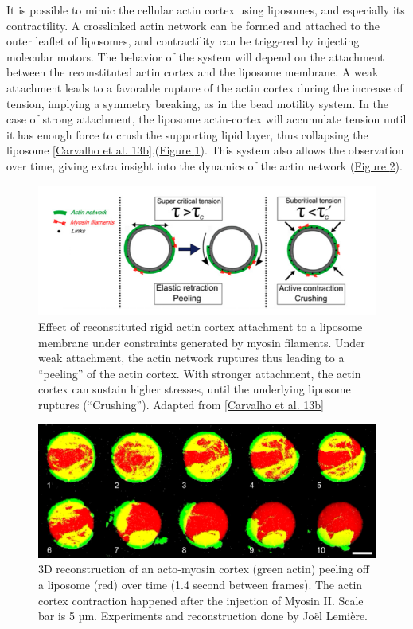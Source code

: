 \documentclass[A4paperpaper,11pt,english]{sphinxmanual}
\begin{document}
It is possible to mimic the cellular actin cortex using liposomes, and especially
its contractility. A crosslinked actin network can be formed and attached to
the outer leaflet of liposomes, and contractility can be triggered by injecting
molecular motors. The behavior of the system will depend on the attachment
between the reconstituted actin cortex and the liposome membrane.  A weak attachment
leads to a favorable rupture of the actin cortex during the increase of tension,
implying a symmetry breaking, as in the bead motility system.  In the case of strong
attachment, the liposome actin-cortex will accumulate tension until it has
enough force to crush the supporting lipid layer, thus collapsing the liposome
{\hyperref[parts/part1:carvalho2013]{{[}Carvalho et al. 13b{]}}},(\hyperref[parts/part1:fig-peeling-scheme]{Figure  \ref*{parts/part1:fig-peeling-scheme}}). This system also allows the observation
over time, giving extra insight into the dynamics of the actin network (\hyperref[parts/part1:fig-peeling-3d]{Figure  \ref*{parts/part1:fig-peeling-3d}}).
\begin{figure}[htbp]
\centering
\capstart

\includegraphics[width=0.800\linewidth]{joel-2-11.png}
\caption{Effect of reconstituted rigid actin cortex attachment to a liposome
membrane under constraints generated by myosin filaments. Under weak attachment,
the actin network ruptures thus leading to a ``peeling'' of the actin cortex.
With stronger attachment, the actin cortex can sustain higher stresses, until
the underlying liposome ruptures (``Crushing''). Adapted from
{\hyperref[parts/part1:carvalho2013]{{[}Carvalho et al. 13b{]}}}}\label{parts/part1:fig-peeling-scheme}\end{figure}
\begin{figure}[htbp]
\centering
\capstart

\includegraphics[width=0.900\linewidth]{joel-5-12.png}
\caption{3D reconstruction of an acto-myosin cortex (green actin) peeling off a
liposome (red) over time (1.4 second between frames). The actin cortex
contraction happened after the injection of Myosin II. Scale bar is 5 µm.
Experiments and reconstruction done by Joël Lemière.}\label{parts/part1:fig-peeling-3d}\end{figure}
\end{document}
